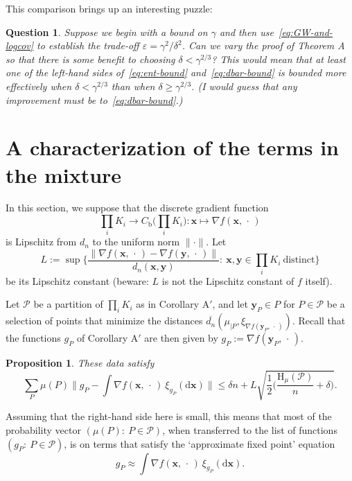 \documentclass[aop,preprint]{imsart}
\newtheorem{prop}[thm]{Proposition}
\newtheorem{ques}[thm]{Question}
\theoremstyle{remark}
\renewcommand{\bf}[1]{\boldsymbol{#1}}
\renewcommand{\rm}[1]{\mathrm{#1}}
\renewcommand{\cal}[1]{\mathcal{#1}}
\newcommand{\rmH}{\mathrm{H}}
\renewcommand{\d}{\mathrm{d}}
\renewcommand{\P}{\mathcal{P}}
\newcommand{\eps}{\varepsilon}
\newcommand{\g}{\gamma}
\newcommand{\ol}[1]{\overline{#1}}
\renewcommand{\to}{\longrightarrow}
\begin{document}
This comparison brings up an interesting puzzle:

\begin{ques}
Suppose we begin with a bound on $\g$ and then use~\eqref{eq:GW-and-logcov} to establish the trade-off $\eps = \g^2/\delta^2$.  Can we vary the proof of Theorem A so that there is some benefit to choosing $\delta < \g^{2/3}$?  This would mean that at least one of the left-hand sides of~\eqref{eq:ent-bound} and~\eqref{eq:dbar-bound} is bounded more effectively when $\delta < \g^{2/3}$ than when $\delta \geq \g^{2/3}$.  (I would guess that any improvement must be to~\eqref{eq:dbar-bound}.)
\end{ques}





\section{A characterization of the terms in the mixture}\label{sec:mix-terms}

In this section, we suppose that the discrete gradient function
\[\prod_i K_i \to C_\rm{b}\Big(\prod_i K_i\Big):\bf{x} \mapsto \nabla f(\bf{x},\,\cdot\,)\]
is Lipschitz from $d_n$ to the uniform norm $\|\cdot\|$.  Let
\[L := \sup\Big\{\frac{\|\nabla f(\bf{x},\,\cdot\,) - \nabla f(\bf{y},\,\cdot\,)\|}{d_n(\bf{x},\bf{y})}:\ \bf{x},\bf{y} \in \prod_i K_i\ \rm{distinct}\Big\}\]
be its Lipschitz constant (beware: $L$ is not the Lipschitz constant of $f$ itself).

Let $\cal{P}$ be a partition of $\prod_i K_i$ as in Corollary A$'$, and let $\bf{y}_P \in P$ for $P \in \cal{P}$ be a selection of points that minimize the distances $\ol{d_n}(\mu_{|P},\xi_{\nabla f(\bf{y}_P,\,\cdot\,)})$.  Recall that the functions $g_P$ of Corollary A$'$ are then given by $g_P := \nabla f(\bf{y}_P,\,\cdot\,)$.


\begin{prop}\label{prop:approx-fix-pt}
	These data satisfy
	\[\sum_{P}\mu(P)\Big\|g_P - \int \nabla f(\bf{x},\,\cdot\,)\ \xi_{g_P}(\d\bf{x})\Big\| \leq \delta n + L\sqrt{\frac{1}{2}\Big(\frac{\rmH_\mu(\P)}{n} + \delta \Big)}.\]
	\end{prop}

Assuming that the right-hand side here is small, this means that most of the probability vector $(\mu(P):\ P\in\P)$, when transferred to the list of functions $(g_P:\ P\in \P)$, is on terms that satisfy the `approximate fixed point' equation
\begin{equation}\label{eq:approx-fix}
g_P \approx \int \nabla f(\bf{x},\,\cdot\,)\ \xi_{g_P}(\d\bf{x}).
\end{equation}
\end{document}
